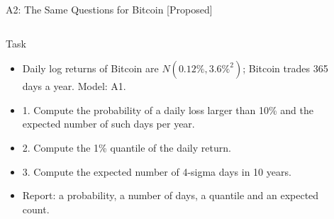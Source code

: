 \begin{frame}{A2: The Same Questions for Bitcoin [Proposed]}
\propsub
\itemsize{\footnotesize}
\begin{columns}[T]
\begin{column}{\taskw}
\begin{block}{Task}
\begin{itemize}
    \item Daily log returns of Bitcoin are $N(0.12\%, 3.6\%^2)$; Bitcoin trades 365 days a year. Model: A1.
    \item 1. Compute the probability of a daily loss larger than 10\% and the expected number of such days per year.
    \item 2. Compute the 1\% quantile of the daily return.
    \item 3. Compute the expected number of 4-sigma days in 10 years.
    \item Report: a probability, a number of days, a quantile and an expected count.
\end{itemize}
\end{block}
\end{column}
\begin{column}{\solw}
\end{column}
\end{columns}
\end{frame}

